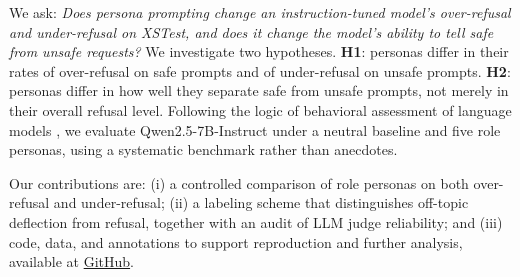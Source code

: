 We ask: \emph{Does persona prompting change an
instruction-tuned model's over-refusal and under-refusal
on XSTest, and does it change the model's ability to
tell safe from unsafe requests?} We investigate two
hypotheses. \textbf{H1}: personas differ in their rates
of over-refusal on safe prompts and of under-refusal
on unsafe prompts. \textbf{H2}: personas differ in how
well they separate safe from unsafe prompts, not
merely in their overall refusal level. Following the
logic of behavioral assessment of language models
\citep[e.g.,][]{binz2023using}, we evaluate
Qwen2.5-7B-Instruct
\citep{qwen2025qwen25technicalreport} under a neutral
baseline and five role personas, using a systematic
benchmark rather than anecdotes.

Our contributions are: (i) a controlled comparison
of role personas on both over-refusal and under-refusal;
(ii) a labeling scheme that distinguishes off-topic
deflection from refusal, together with an audit of
LLM judge reliability; and (iii) code, data, and
annotations to support reproduction and further
analysis, available at \href{https://github.com/gursul/persona-safety-calibration}{GitHub}.
